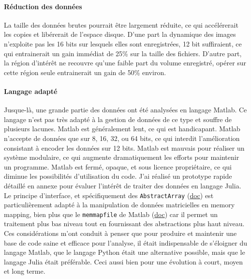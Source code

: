 
\paragraph{Réduction des données}
La taille des données brutes pourrait être largement réduite, ce qui accélérerait les copies et libérerait de l'espace disque. D'une part la dynamique des images n'exploite pas les 16 bits sur lesquels elles sont enregistrées, 12 bit suffiraient, ce qui entrainerait un gain immédiat de 25\% sur la taille des fichiers. D'autre part, la région d'intérêt ne recouvre qu'une faible part du volume enregistré, opérer sur cette région seule entrainerait un gain de 50\% environ.


\paragraph{Langage adapté} %
Jusque-là, une grande partie des données ont été analysées en langage Matlab. Ce langage n'est pas très adapté à la gestion de données de ce type et souffre de plusieurs lacunes. Matlab est généralement lent, ce qui est handicapant. Matlab n'accepte de données que sur 8, 16, 32, ou 64 bits, ce qui interdit l'amélioration consistant à encoder les données sur 12 bits. Matlab est mauvais pour réaliser un système modulaire, ce qui augmente dramatiquement les efforts pour maintenir un programme. Matlab est fermé, opaque, et sous licence propriétaire, ce qui diminue les possibilités d'utilisation du code.
J'ai réalisé un prototype rapide détaillé en annexe pour évaluer l'intérêt de traiter des données en langage Julia. Le principe d'interface, et spécifiquement des \verb|AbstractArray| (\href{https://docs.julialang.org/en/v1/manual/interfaces/#man-interface-array-1}{doc}) est particulièrement adapté à la manipulation de données matricielles en memory mapping, bien plus que le \verb|memmapfile| de Matlab (\href{https://fr.mathworks.com/help/matlab/ref/memmapfile.html}{doc}) car il permet un traitement plus bas niveau tout en fournissant des abstractions plus haut niveau. Ces considérations m'ont conduit à penser que pour produire et maintenir une base de code saine et efficace pour l'analyse, il était indispensable de s'éloigner du langage Matlab, que le langage Python était une alternative possible, mais que le langage Julia était préférable. Ceci aussi bien pour une évolution à court, moyen et long terme.

